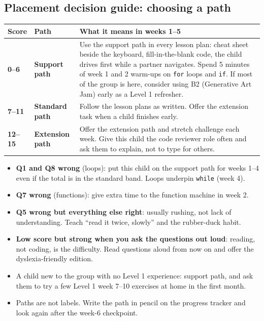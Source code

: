 \subsection{Placement decision guide: choosing a path}
\begin{rubric}
\renewcommand{\arraystretch}{1.3}
\begin{tabularx}{\linewidth}{@{}>{\bfseries}p{2.2cm}>{\bfseries}p{2.6cm}X@{}}
\toprule
Score & Path & What it means in weeks 1--5 \\ \midrule
0--6 & Support path & Use the support path in every lesson plan: cheat sheet beside the keyboard, fill-in-the-blank code, the child drives first while a partner navigates. Spend 5 minutes of week 1 and 2 warm-ups on \texttt{for} loops and \texttt{if}. If most of the group is here, consider using B2 (Generative Art Jam) early as a Level 1 refresher. \\
7--11 & Standard path & Follow the lesson plans as written. Offer the extension task when a child finishes early. \\
12--15 & Extension path & Offer the extension path and stretch challenge each week. Give this child the code reviewer role often and ask them to explain, not to type for others. \\
\bottomrule
\end{tabularx}
\end{rubric}

\begin{tip}
\begin{itemize}[itemsep=1pt]
  \item \textbf{Q1 and Q8 wrong} (loops): put this child on the support path for weeks 1--4
        even if the total is in the standard band. Loops underpin \texttt{while} (week 4).
  \item \textbf{Q7 wrong} (functions): give extra time to the function machine in week 2.
  \item \textbf{Q5 wrong but everything else right}: usually rushing, not lack of understanding.
        Teach \enquote{read it twice, slowly} and the rubber-duck habit.
  \item \textbf{Low score but strong when you ask the questions out loud}: reading, not coding, is
        the difficulty. Read questions aloud from now on and offer the dyslexia-friendly edition.
  \item A child new to the group with no Level 1 experience: support path, and ask them to try a few
        Level 1 week 7--10 exercises at home in the first month.
  \item Paths are not labels. Write the path in pencil on the progress tracker and look again after
        the week-6 checkpoint.
\end{itemize}
\end{tip}

